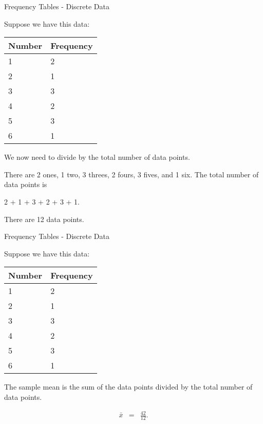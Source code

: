 \begin{frame}{Frequency Tables - Discrete Data}

  Suppose we have this data: \\
    \begin{tabular}{l|l}
      Number  & Frequency \\ \hline
      1 & {\color{red}2} \\
      2 & {\color{red}1} \\
      3 & {\color{red}3} \\
      4 & {\color{red}2} \\
      5 & {\color{red}3} \\
      6 & {\color{red}1}
    \end{tabular}

    We now need to divide by the total number of data points.

    {

      There are {\color{red}2} ones, {\color{red}1} two,
      {\color{red}3} threes, {\color{red}2} fours, {\color{red}3}
      fives, and {\color{red}1}
      six. The total number of data points is  \\
      \begin{center}
        {\color{red}2} + {\color{red}1} + {\color{red}3}
        + {\color{red}2} + {\color{red}3} + {\color{red}1}.
      \end{center}

      {
        There are 12 data points.
      }
    }
  
\end{frame}


\begin{frame}{Frequency Tables - Discrete Data}

  Suppose we have this data: \\
    \begin{tabular}{l|l}
      Number  & Frequency \\ \hline
      1 & {\color{red}2} \\
      2 & {\color{red}1} \\
      3 & {\color{red}3} \\
      4 & {\color{red}2} \\
      5 & {\color{red}3} \\
      6 & {\color{red}1}
    \end{tabular}

    The sample mean is the sum of the data points divided by the total
    number of data points.

    {
      \begin{eqnarray*}
        \bar{x} & = & \frac{42}{12}.
      \end{eqnarray*}
    }
  
\end{frame}


